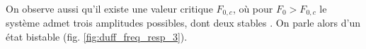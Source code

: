 On observe aussi qu'il existe une valeur critique $F_{0,c}$, où pour $F_0 > F_{0,c}$ le système admet trois amplitudes possibles, dont deux stables \cite{landau_mechanics_1976}. On parle alors d'un état bistable (fig. \ref{fig:duff_freq_resp_3}).
%
\begin{figure}


\end{figure}
